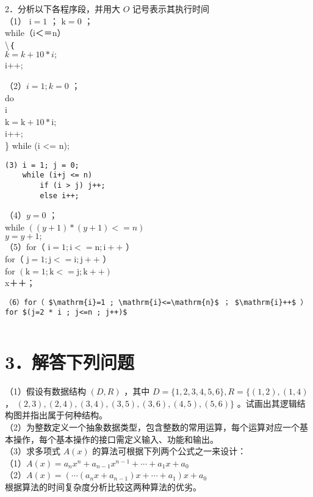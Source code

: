 \documentclass[12pt,a4paper]{amsart}
\begin{document}
2．分析以下各程序段，并用大 $O$ 记号表示其执行时间\\
（1） $\mathrm{i}=1$ ； $\mathrm{k}=0$ ；\\
while（i＜＝n）\\
\textbackslash ｛\\
$k=k+10 * i ;$\\
i++;

（2）$i=1 ; k=0$ ；\\
do\\
i\\
$\mathrm{k}=\mathrm{k}+10 * \mathrm{i}$;\\
i++;\\
\} while (i <= n);

\begin{verbatim}
(3) i = 1; j = 0;
    while (i+j <= n)
        if (i > j) j++;
        else i++;
\end{verbatim}

（4）$y=0$ ；\\
while $((y+1) *(y+1)<=n)$\\
$y=y+1 ;$\\
（5）for（ $\mathrm{i}=1 ; \mathrm{i}<=\mathrm{n} ; \mathrm{i}++$ ）\\
for（ $\mathrm{j}=1 ; \mathrm{j}<=\mathrm{i} ; \mathrm{j}++$ ）\\
for $(\mathrm{k}=1 ; \mathrm{k}<=\mathrm{j} ; \mathrm{k}++)$\\
x＋＋；

\begin{verbatim}
（6）for（ $\mathrm{i}=1 ; \mathrm{i}<=\mathrm{n}$ ； $\mathrm{i}++$ ）
for $(j=2 * i ; j<=n ; j++)$
\end{verbatim}

\begin{verbatim}

\end{verbatim}

\section*{3．解答下列问题}
（1）假设有数据结构 $(D, R)$ ，其中 $D=\{1,2,3,4,5,6\}, R=\{(1,2),(1,4)$ ， $(2,3),(2,4),(3,4),(3,5),(3,6),(4,5),(5,6)\}$ 。试画出其逻辑结构图并指出属于何种结构。\\
（2）为整数定义一个抽象数据类型，包含整数的常用运算，每个运算对应一个基本操作，每个基本操作的接口需定义输入、功能和输出。\\
（3）求多项式 $A(x)$ 的算法可根据下列两个公式之一来设计：\\
（1）$A(x)=a_{n} x^{n}+a_{n-1} x^{n-1}+\cdots+a_{1} x+a_{0}$\\
（2）$A(x)=\left(\cdots\left(a_{n} x+a_{n-1}\right) x+\cdots+a_{1}\right) x+a_{0}$\\
根据算法的时间复杂度分析比较这两种算法的优劣。
\end{document}
